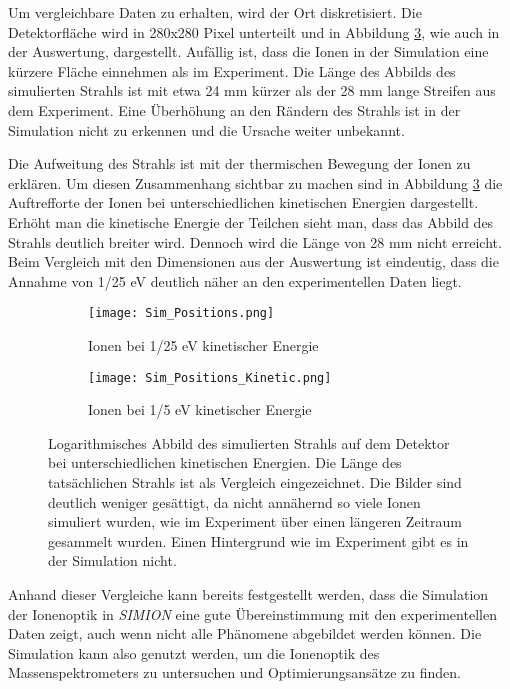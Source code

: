 Um vergleichbare Daten zu erhalten, wird der Ort diskretisiert. Die Detektorfläche wird in 280x280 Pixel unterteilt und in Abbildung \ref{fig:sim_pos_both}, wie auch in der Auswertung, dargestellt. Aufällig ist, dass die Ionen in der Simulation eine kürzere Fläche einnehmen als im Experiment. Die Länge des Abbilds des simulierten Strahls ist mit etwa 24 mm kürzer als der 28 mm lange Streifen aus dem Experiment. Eine Überhöhung an den Rändern des Strahls ist in der Simulation nicht zu erkennen und die Ursache weiter unbekannt.

Die Aufweitung des Strahls ist mit der thermischen Bewegung der Ionen zu erklären. Um diesen Zusammenhang sichtbar zu machen sind in Abbildung \ref{fig:sim_pos_both} die Auftrefforte der Ionen bei unterschiedlichen kinetischen Energien dargestellt. Erhöht man die kinetische Energie der Teilchen sieht man, dass das Abbild des Strahls deutlich breiter wird. Dennoch wird die Länge von 28 mm nicht erreicht. Beim Vergleich mit den Dimensionen aus der Auswertung ist eindeutig, dass die Annahme von 1/25 eV deutlich näher an den experimentellen Daten liegt. 

\begin{figure}
    \centering
    \begin{subfigure}{.43\textwidth}
        \centering
        \texttt{[image: Sim\_Positions.png]}
        \caption{Ionen bei 1/25 eV kinetischer Energie}
        \label{fig:sim_pos}
    \end{subfigure}%
    \hfill
    \begin{subfigure}{.45\textwidth}
        \centering
        \texttt{[image: Sim\_Positions\_Kinetic.png]}
        \caption{Ionen bei 1/5 eV kinetischer Energie}
        \label{fig:sim_pos_kinetic}
    \end{subfigure}
    \caption[Simuliertes Abbild des Strahls auf dem Detektor bei verschiedenen Energien]{Logarithmisches Abbild des simulierten Strahls auf dem Detektor bei unterschiedlichen kinetischen Energien. Die Länge des tatsächlichen Strahls ist als Vergleich eingezeichnet. Die Bilder sind deutlich weniger gesättigt, da nicht annähernd so viele Ionen simuliert wurden, wie im Experiment über einen längeren Zeitraum gesammelt wurden. Einen Hintergrund wie im Experiment gibt es in der Simulation nicht.}
    \label{fig:sim_pos_both}
\end{figure}

Anhand dieser Vergleiche kann bereits festgestellt werden, dass die Simulation der Ionenoptik in \textit{SIMION} eine gute Übereinstimmung mit den experimentellen Daten zeigt, auch wenn nicht alle Phänomene abgebildet werden können. Die Simulation kann also genutzt werden, um die Ionenoptik des Massenspektrometers zu untersuchen und Optimierungsansätze zu finden.


